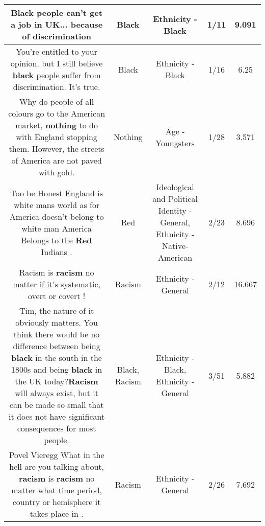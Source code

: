 \documentclass[11pt]{article}
\newlength\mylength
\begin{document}
\begin{center}
\begin{longtable}{|C{.65\mylength}|C{.30\mylength}|C{.12\mylength}|C{.12\mylength}|C{.12\mylength}|}
  \small Black people can't get a job in UK... because of discrimination\normalsize   & Black & Ethnicity - Black & 1/11 & 9.091 \\  \hline
  \small You're entitled to your opinion. but I still believe \textbf{black} people suffer from discrimination. It's true.\normalsize   & Black & Ethnicity - Black & 1/16 & 6.25 \\  \hline
  \small Why do people of all colours go to the American market, \textbf{nothing} to do with England stopping them. However, the streets of America are not paved with gold.\normalsize   & Nothing & Age - Youngsters & 1/28 & 3.571 \\  \hline
  \small Too be Honest England is white mans world as for America doesn't belong to white man America Belongs to the \textbf{R\textbf{ed}} Indians .\normalsize   & Red &  Ideological and Political Identity - General, Ethnicity - Native-American & 2/23 & 8.696 \\  \hline
  \small Racism is \textbf{racism} no matter if it's systematic, overt or covert !\normalsize   & Racism & Ethnicity - General & 2/12 & 16.667 \\  \hline
  \small Tim, the nature of it obviously matters. You think there would be no difference between being \textbf{black} in the south in the 1800s and being \textbf{black} in the UK today?\textbf{Racism} will always exist, but it can be made so small that it does not have significant consequences for most people.\normalsize   & Black, Racism & Ethnicity - Black, Ethnicity - General & 3/51 & 5.882 \\  \hline
  \small Povel Vieregg What in the hell are you talking about, \textbf{racism} is \textbf{racism} no matter what time period, country or hemisphere it takes place in .\normalsize   & Racism & Ethnicity - General & 2/26 & 7.692 \\  \hline

\end{longtable}
\end{center}
\end{document}
